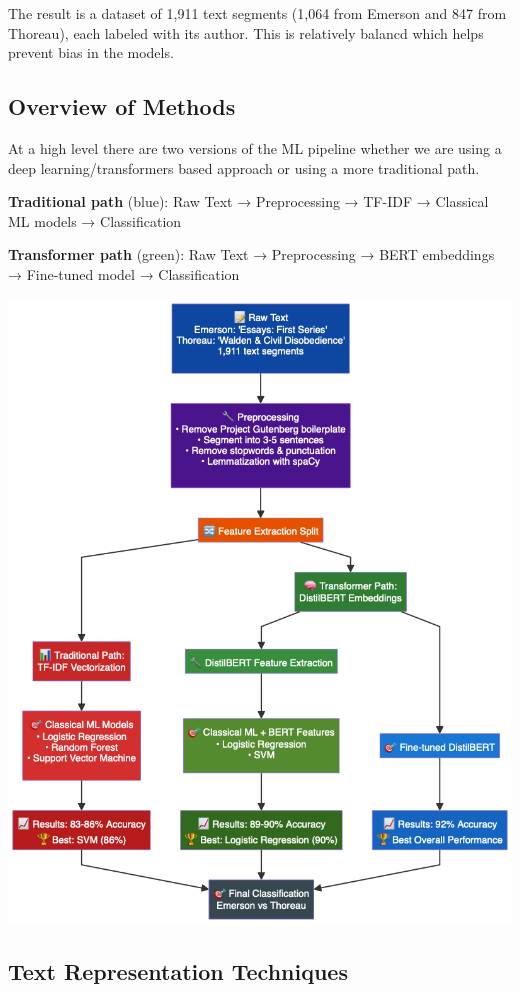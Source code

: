 \documentclass[
]{article}
\begin{document}
The result is a dataset of 1,911 text segments (1,064 from Emerson and
847 from Thoreau), each labeled with its author. This is relatively balancd which helps prevent bias in the models.

\subsection{Overview of Methods}\label{overview-of-methods}

At a high level there are two versions of the ML pipeline whether we are
using a deep learning/transformers based approach or using a more
traditional path.

\textbf{Traditional path} (blue): Raw Text → Preprocessing → TF-IDF →
Classical ML models → Classification

\textbf{Transformer path} (green): Raw Text → Preprocessing → BERT
embeddings → Fine-tuned model → Classification

\includegraphics[width=8.33333in,height=\textheight]{image-20250611165131252.png}

\subsection{Text Representation
Techniques}\label{text-representation-techniques}
\end{document}
